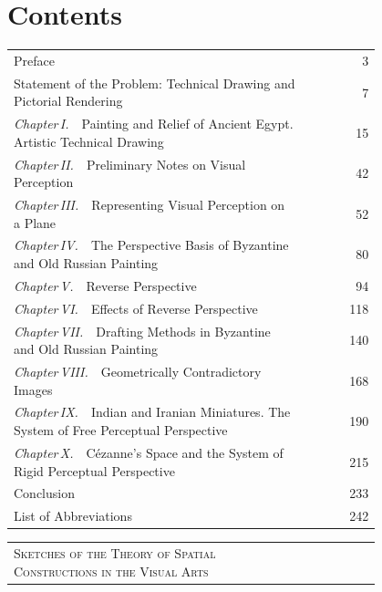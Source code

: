 \chapter*{Contents}
\thispagestyle{plain}

\begin{center}
  \begin{tabular}{@{}p{0.80\linewidth}r@{}}
    Preface  &  3 \\[0.4em]
    Statement of the Problem: Technical Drawing and Pictorial Rendering  &  7 \\[0.4em]
    \textit{Chapter\,I.}\ \ Painting and Relief of Ancient Egypt.
      Artistic Technical Drawing  &  15 \\[0.4em]
    \textit{Chapter\,II.}\ \ Preliminary Notes on Visual Perception  &  42 \\[0.4em]
    \textit{Chapter\,III.}\ \ Representing Visual Perception on a Plane  &  52 \\[0.4em]
    \textit{Chapter\,IV.}\ \ The Perspective Basis of Byzantine
      and Old Russian Painting  &  80 \\[0.4em]
    \textit{Chapter\,V.}\ \ Reverse Perspective  &  94 \\[0.4em]
    \textit{Chapter\,VI.}\ \ Effects of Reverse Perspective  &  118 \\[0.4em]
    \textit{Chapter\,VII.}\ \ Drafting Methods in Byzantine
      and Old Russian Painting  &  140 \\[0.4em]
    \textit{Chapter\,VIII.}\ \ Geometrically Contradictory Images  &  168 \\[0.4em]
    \textit{Chapter\,IX.}\ \ Indian and Iranian Miniatures.
      The System of Free Perceptual Perspective  &  190 \\[0.4em]
    \textit{Chapter\,X.}\ \ Cézanne's Space and the System of
      Rigid Perceptual Perspective  &  215 \\[0.4em]
    Conclusion  &  233 \\[0.4em]
    List of Abbreviations  &  242 \\[1em] 
      \end{tabular}
  \begin{tabular}{@{}p{0.80\linewidth}r@{}}{\textsc{Sketches of the Theory of Spatial Constructions in the Visual Arts}} \\[0.4em]

\end{tabular}
\end{center}
